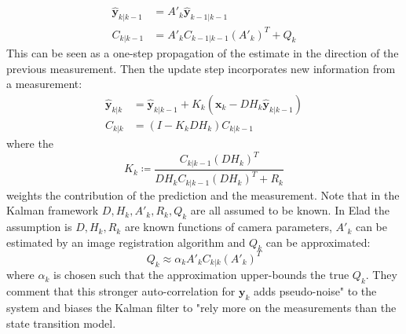 \begin{align}
	\hat{\bm{y}}_{k|k-1} & = A'_k \hat{\bm{y}}_{k-1|k-1}     \\
	C_{k|k-1}            & = A'_k C_{k-1|k-1} (A'_k)^T + Q_k
\end{align}
This can be seen as a one-step propagation of the estimate in the direction of the previous measurement.
%
Then the update step incorporates new information from a measurement:
\begin{align}
	\hat{\bm{y}}_{k|k} & = \hat{\bm{y}}_{k|k-1} + K_k(\bm{x}_k - DH_k\hat{\bm{y}}_{k|k-1} ) \\
	C_{k|k}            & = (I - K_k DH_k)C_{k|k-1}
\end{align}
where the 
\begin{equation}
	K_k \coloneqq \frac{C_{k|k-1}(DH_k)^T}{DH_k C_{k|k-1} (DH_k)^T + R_k }
\end{equation}
weights the contribution of the prediction and the measurement.
%
Note that in the Kalman framework \(D, H_k, A'_k, R_k, Q_k\) are all assumed to be known.
%
In Elad \etal\cite{elad1999} the assumption is \(D, H_k, R_k\) are known functions of camera parameters, \(A'_k\) can be estimated by an image registration algorithm and \(Q_k\) can be approximated:
\begin{equation}
	Q_k \approx \alpha_k A'_k C_{k|k} (A'_k)^T
\end{equation}
where \(\alpha_k\) is chosen such that the approximation upper-bounds the true \(Q_k\).
%
They comment that this stronger auto-correlation for \(\bm{y}_k\) adds pseudo-noise" to the system and biases the Kalman filter to "rely more on the measurements than the state transition model.
